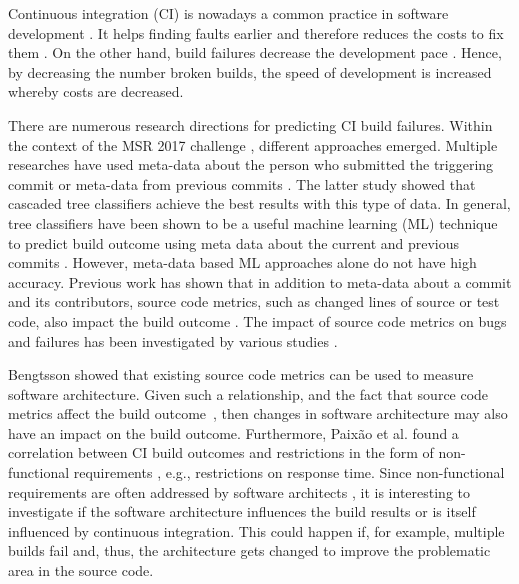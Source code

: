 \documentclass[sigplan, anonymous, review]{acmart}
\begin{document}
Continuous integration (CI) is nowadays a common practice in software development \cite{CI-Common}. It helps finding faults earlier and therefore reduces the costs to fix them \cite{NutzenCI}. On the other hand, build failures decrease the development pace \cite{Costs-BuildFailures}. Hence, by decreasing the number broken builds, the speed of development is increased whereby costs are decreased.

There are numerous research directions for predicting CI build failures. Within the context of the MSR 2017 challenge \cite{TravisTorrent}, different approaches emerged.
Multiple researches have used meta-data about the person who submitted the triggering commit \cite{ContrInvolv} or meta-data from previous commits \cite{Pred-Cascade}. The latter study showed that cascaded tree classifiers achieve the best results with this type of data. 
In general, tree classifiers have been shown to be a useful machine learning (ML) technique to predict build outcome using meta data about the current and previous commits \cite{Pred-Tree}. 
However, meta-data based ML approaches alone do not have high accuracy.
Previous work has shown that in addition to meta-data about a commit and its contributors, source code metrics, such as changed lines of source or test code, also impact the build outcome \cite{FailsCorr}. The impact of source code metrics on bugs and failures has been investigated by various studies \cite{MetricsSource1, MetricsSource2}. 

Bengtsson \cite{arc-metrics} showed that existing source code metrics can be used to measure software architecture. 
Given such a relationship, and the fact that source code metrics affect the build outcome~\cite{MetricsSource1, MetricsSource2, FailsCorr}, then changes in software architecture may also have an impact on the build outcome.
Furthermore, Paix\~{a}o et al. found a correlation between CI build outcomes and restrictions in the form of non-functional requirements \cite{Fail-NFReq}, e.g., restrictions on response time.
Since non-functional requirements are often addressed by software architects \cite{NFR-Architects}, it is interesting to investigate if the software architecture influences the build results or is itself influenced by continuous integration. 
This could happen if, for example, multiple builds fail and, thus, the architecture gets changed to improve the problematic area in the source code.
\end{document}
